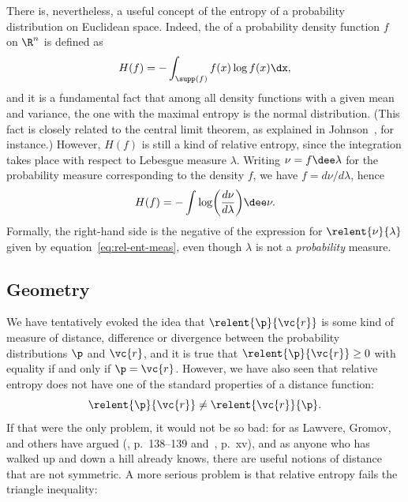 There is, nevertheless, a useful concept of the entropy of a probability
distribution on Euclidean space.  Indeed, the
%
%
%
% 
of a probability density function $f$ on $\R^n$ is defined as
% 
\[
H(f)
=
-\int_{\supp(f)} f(x) \log f(x) \dx,
\]
% 
and it is a fundamental fact that among all density functions with a given
mean and variance, the one with the maximal entropy is the
normal%
%
% 
distribution.  (This fact is closely related
to the central%
%
% 
limit theorem, as explained in Johnson~\cite{JohnITC}, for instance.)
However, $H(f)$ is still a kind of relative entropy, since the integration
takes place with respect to Lebesgue measure $\lambda$.  Writing $\nu =
f\dee\lambda$ for the probability measure corresponding to the density $f$,
we have $f = d\nu/d\lambda$, hence
\[
H(f)
=
- \int \log \biggl( \frac{d\nu}{d\lambda} \biggr) \dee\nu.
\]
Formally, the right-hand side is the negative of the expression for
$\relent{\nu}{\lambda}$ given by equation~\eqref{eq:rel-ent-meas}, even
though $\lambda$ is not a \emph{probability} measure.


\subsection*{Geometry}

We have tentatively evoked the idea that $\relent{\p}{\vc{r}}$ is some kind
of measure of distance, difference or divergence between the probability
distributions $\p$ and $\vc{r}$, and it is true that $\relent{\p}{\vc{r}}
\geq 0$ with equality if and only if $\p = \vc{r}$.  However, we have also
seen that relative entropy does not have one of the standard properties of
a distance function:
\[
\relent{\p}{\vc{r}} \neq \relent{\vc{r}}{\p}.
% 
\index{relative entropy!asymmetry of}
\]
If that were the only problem, it would not be so bad: for as Lawvere,%
% 
% 
Gromov,%
% 
% 
and others have argued (\cite{LawvMSG}, p.~138--139
and~\cite{GromMSR}, p.~xv), and as anyone who has walked up and down a
hill 
already knows, there are useful notions of distance%
% 
% 
that are not symmetric.  A more serious problem is that relative entropy
fails the triangle inequality:%
% 

